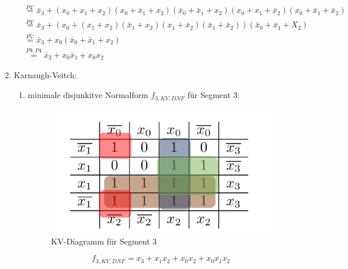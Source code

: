 \documentclass[a4paper]{article}
\begin{document}
\begin{enumerate}[label=\alph*)]
\begin{equation*}
\begin{aligned}
                           &\stackrel{P4'}{=} \bar{x}_3 + (x_0+x_1+x_2)(x_0+\bar{x}_1+x_2)(\bar{x}_0+\bar{x}_1+x_2)(x_0+x_1+\bar{x}_2)(x_0+\bar{x}_1+\bar{x}_2) \\
                           &\stackrel{P4'}{=} \bar{x}_3 + (x_0+(x_1+x_2)(\bar{x}_1+x_2)(x_1+\bar{x}_2)(\bar{x}_1+\bar{x}_2))(\bar{x}_0+\bar{x}_1+X_2) \\
                           &\stackrel{P5'}{=} \bar{x}_3 + x_0 (\bar{x}_0+\bar{x}_1+x_2) \\
                           &\stackrel{P9, P4}{=} \bar{x}_3+x_0\bar{x}_1 + x_0x_2
            \end{aligned}
	\end{equation*}
	
	\clearpage
	\item Karnaugh-Veitch:
	\begin{enumerate}[label=\roman*)]
		\item minimale disjunkitve Normalform $f_{3, KV, DNF}$ für Segment 3:
		
		\begin{figure}[h]
			\begin{center}
				\includegraphics[scale=0.25]{KV-Segment-3.png}
			\end{center}
			\caption{KV-Diagramm für Segment 3}
		\end{figure}
	
		\begin{equation}
			f_{3, KV, DNF} = x_3 + x_1x_2 + x_0x_2 + \overline{x_0 x_1 x_2}
		\end{equation}
		

\end{enumerate}
\end{enumerate}
\end{document}
